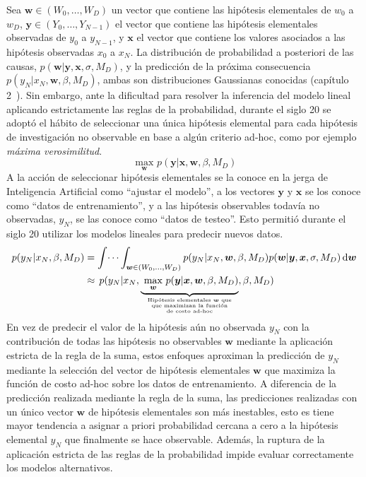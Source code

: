 \documentclass[a4paper,11pt]{book}
\newcommand\hfrac[2]{\genfrac{}{}{0pt}{}{#1}{#2}} %
\theoremstyle{definition}
\begin{document}

Sea $\bm{w} \in (W_0, \dots, W_D)$ un vector que contiene las hipótesis elementales de $w_0$ a $w_D$, $\bm{y} \in (Y_0, \dots, Y_{N-1})$ el vector que contiene las hipótesis elementales observadas de $y_0$ a $y_{N-1}$, y $\bm{x}$ el vector que contiene los valores asociados a las hipótesis observadas $x_0$ a $x_N$.
%
La distribución de probabilidad a posteriori de las causas, $p(\bm{w}|\bm{y}, \bm{x}, \sigma, M_D)$, y la predicción de la próxima consecuencia $p(y_{N}|x_{N}, \bm{w}, \beta, M_D)$, ambas son distribuciones Gaussianas conocidas (cap\'itulo 2~\cite{Bishop2006}).
%
Sin embargo, ante la dificultad para resolver la inferencia del modelo lineal aplicando estrictamente las reglas de la probabilidad, durante el siglo 20 se adoptó el hábito de seleccionar una \'unica hip\'otesis elemental para cada hipótesis de investigación no observable en base a alg\'un criterio ad-hoc, como por ejemplo \emph{máxima verosimilitud}.
%
\begin{equation*}
 \underset{\bm{w}}{\text{ max }} p(\bm{y} | \bm{x}, \bm{w}, \beta, M_D)
\end{equation*}
%
A la acción de seleccionar hipótesis elementales se la conoce en la jerga de Inteligencia Artificial como ``ajustar el modelo'', a los vectores $\bm{y}$ y $\bm{x}$ se los conoce como ``datos de entrenamiento'', y a las hipótesis observables todav\'ia no observadas, $y_N$, se las conoce como ``datos de testeo''.
%
Esto permitió durante el siglo 20 utilizar los modelos lineales para predecir nuevos datos.
%
\begin{equation} \label{eq:prediccion_ad_hoc}
\begin{split}
p(y_N|x_N, \beta, M_D)
 & = \int\dots\int_{\bm{w} \in (W_0, \dots, W_D)} p(y_{N}|x_{N}, \bm{w}, \beta, M_D) p(\bm{w}|\bm{y}, \bm{x},\sigma, M_D) \, \text{d}\bm{w} \\
 &\approx \,  p(y_N|x_{N}, \underbrace{\underset{\bm{w}}{\text{ max }} p(\bm{y} | \bm{x}, \bm{w}, \beta, M_D)}_{\hfrac{\text{Hipótesis elementales $\bm{w}$ que}}{\hfrac{\text{que maximizan la función}}{\text{de costo ad-hoc}} } } , \beta, M_D)
\end{split}
\end{equation}
%
En vez de predecir el valor de la hipótesis aún no observada $y_N$ con la contribución de todas las hipótesis no observables $\bm{w}$ mediante la aplicación estricta de la regla de la suma, estos enfoques aproximan la predicción de $y_N$ mediante la selección del vector de hipótesis elementales $\bm{w}$ que maximiza la función de costo ad-hoc sobre los datos de entrenamiento.
%
A diferencia de la predicción realizada mediante la regla de la suma, las predicciones realizadas con un único vector $\bm{w}$ de hipótesis elementales son más inestables, esto es tiene mayor tendencia a asignar a priori probabilidad cercana a cero a la hipótesis elemental $y_N$ que finalmente se hace observable.
%
Además, la ruptura de la aplicación estricta de las reglas de la probabilidad impide evaluar correctamente los modelos alternativos.
\end{document}
